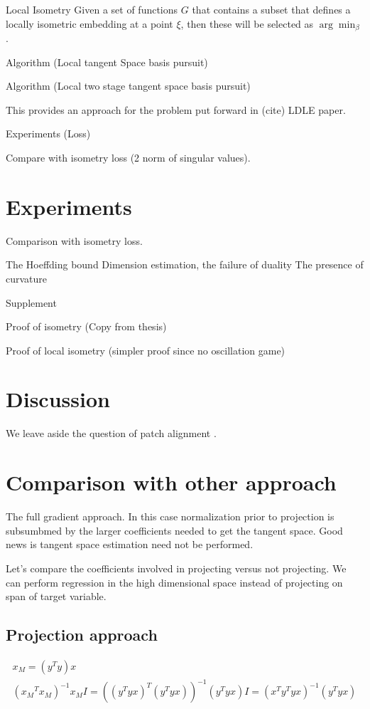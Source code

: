 \documentclass[a4paper,11pt]{article}
\begin{document}
\begin{proposition}{Local Isometry}
Given a set of functions $G$ that contains a subset that defines a locally isometric embedding at a point $\xi$, then these will be selected as $\arg \min_\beta$.
\end{proposition}

Algorithm (Local tangent Space basis pursuit)

Algorithm (Local two stage tangent space basis pursuit)

This provides an approach for the problem put forward in (cite) LDLE paper.

Experiments (Loss)

Compare with isometry loss (2 norm of singular values).

\section{Experiments}

Comparison with isometry loss.

The Hoeffding bound
Dimension estimation, the failure of duality
The presence of curvature

Supplement

Proof of isometry (Copy from thesis)

Proof of local isometry (simpler proof since no oscillation game)

\section{Discussion}

We leave aside the question of patch alignment \cite{https://arxiv.org/pdf/2303.11620.pdf, LDLE paper}.

\section{Comparison with other approach}


The full gradient approach.
In this case normalization prior to projection is subsumbmed by the larger coefficients needed to get the tangent space.
Good news is tangent space estimation need not be performed.

Let's compare the coefficients involved in projecting versus not projecting.
We can perform regression in the high dimensional space instead of projecting on span of target variable.

\subsection{Projection approach}

\begin{align}
x_M = (y^T y) x \\ 
({x_M}^T {x_M})^{-1} {x_M} I = ({(y^T y x)}^T {(y^T y x)})^{-1} {(y^T y x)} I = (x^T y^T y x)^{-1} (y^T y x)
\end{align}

\end{document}
